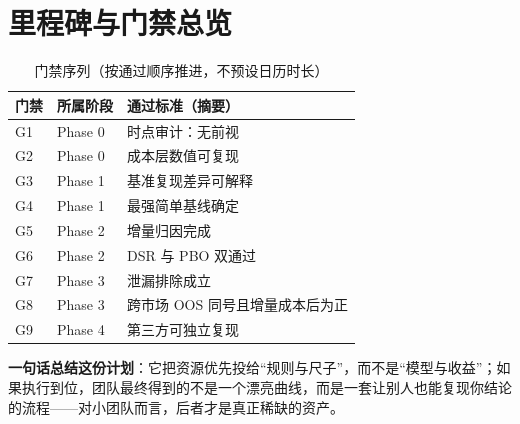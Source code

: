 \documentclass[11pt,a4paper]{ctexart}
\begin{document}
\section{里程碑与门禁总览}

\begin{table}[htbp]
\centering
\caption{门禁序列（按通过顺序推进，不预设日历时长）}
\label{tab:gates}
\begin{tabular}{@{}>{\raggedright\arraybackslash}p{1.2cm}>{\raggedright\arraybackslash}p{3.0cm}>{\raggedright\arraybackslash}p{9.4cm}@{}}
\toprule
门禁 & 所属阶段 & 通过标准（摘要） \\
\midrule
G1 & Phase 0 & 时点审计：无前视 \\
G2 & Phase 0 & 成本层数值可复现 \\
G3 & Phase 1 & 基准复现差异可解释 \\
G4 & Phase 1 & 最强简单基线确定 \\
G5 & Phase 2 & 增量归因完成 \\
G6 & Phase 2 & DSR 与 PBO 双通过 \\
G7 & Phase 3 & 泄漏排除成立 \\
G8 & Phase 3 & 跨市场 OOS 同号且增量成本后为正 \\
G9 & Phase 4 & 第三方可独立复现 \\
\bottomrule
\end{tabular}
\end{table}

\noindent\textbf{一句话总结这份计划}：它把资源优先投给“规则与尺子”，而不是“模型与收益”；如果执行到位，团队最终得到的不是一个漂亮曲线，而是一套让别人也能复现你结论的流程——对小团队而言，后者才是真正稀缺的资产。
\end{document}
